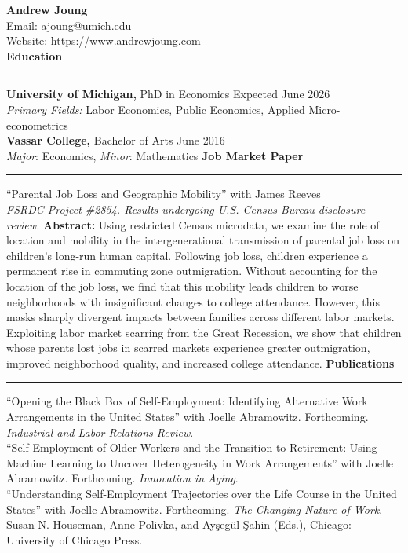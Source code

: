 \documentclass[12pt,letterpaper]{article}
\newcommand{\cvheading}[1]{%
    \vspace{0.5cm}
    {\Large \textbf{#1}}
    \vspace{0.1cm}
    \hrule
    \vspace{0.2cm}
}
\begin{document}
{\LARGE \textbf{Andrew Joung}}\\
Email: \url{ajoung@umich.edu} \\
Website:  \url{https://www.andrewjoung.com} \\
\cvheading{Education}
\textbf{University of Michigan,} PhD in Economics \hfill Expected June 2026\\
\textit{Primary Fields:} Labor Economics, Public Economics, Applied Micro-econometrics
\\[0.2cm]
\textbf{Vassar College,} Bachelor of Arts \hfill June 2016\\
\textit{Major}: Economics, \textit{Minor}: Mathematics
\cvheading{Job Market Paper}
``Parental Job Loss and Geographic Mobility'' with James Reeves \\
\textit{FSRDC Project \#2854. Results undergoing U.S. Census Bureau disclosure review.}
\vspace{0.2cm}
\textbf{Abstract:} Using restricted Census microdata, we examine the role of location and mobility in the intergenerational transmission of parental job loss on children's long-run human capital. Following job loss, children experience a permanent rise in commuting zone outmigration. Without accounting for the location of the job loss, we find that this mobility leads children to worse neighborhoods with insignificant changes to college attendance. However, this masks sharply divergent impacts between families across different labor markets. Exploiting labor market scarring from the Great Recession, we show that children whose parents lost jobs in scarred markets experience greater outmigration, improved neighborhood quality, and increased college attendance.
\cvheading{Publications}
``Opening the Black Box of Self-Employment: Identifying Alternative Work Arrangements in the United States'' with Joelle Abramowitz. Forthcoming. \textit{Industrial and Labor Relations Review}.
\\[0.2cm]
``Self-Employment of Older Workers and the Transition to Retirement: Using Machine Learning to Uncover Heterogeneity in Work Arrangements'' with Joelle Abramowitz. Forthcoming. \textit{Innovation in Aging}.
\\[0.2cm]
``Understanding Self-Employment Trajectories over the Life Course in the United States'' with Joelle Abramowitz. Forthcoming. \textit{The Changing Nature of Work}. Susan N. Houseman, Anne Polivka, and Ayşegül Şahin (Eds.), Chicago: University of Chicago Press.
\\[0.2cm]
\end{document}
